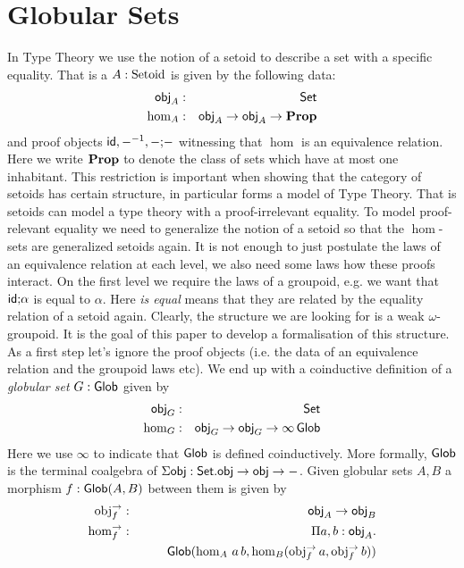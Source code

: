 \section{Globular Sets}
\label{sec:glob}


In Type Theory we use the notion of a setoid to describe a set with a
specific equality. That is a $A : \mathrm{Setoid}$ is given by the
following data:
\begin{eqnarray*}
  \mathsf{obj}_A & : & \mathsf{Set} \\
  \hom_A & : & \mathsf{obj}_A \rightarrow \mathsf{obj}_A \rightarrow \mathbf{Prop}
\end{eqnarray*}
and proof objects $\mathsf{id}, {-}^{-1}, - \text{;} -$ witnessing that $\hom$ is an
equivalence relation. Here we write $\mathbf{Prop}$ to denote the class of sets
which have at most one inhabitant. This restriction is important when
showing that the category of setoids has certain structure, in
particular forms a model of Type Theory. That is setoids can model a
type theory with a proof-irrelevant equality. To model proof-relevant
equality we need to generalize the notion of a setoid so that the
$\hom$-sets are generalized setoids again. It is not enough to just
postulate the laws of an equivalence relation at each level, we also
need some laws how these proofs interact. On the first level we
require the laws of a groupoid, e.g. we want that $\mathsf{id} \text{;} \alpha$ is
equal to $\alpha$. Here \emph{is equal} means that they are related by the
equality relation of a setoid again. Clearly, the structure we are
looking for is a weak $\omega$-groupoid. It is the goal of this paper
to develop a formalisation of this structure. As a first step let's
ignore the proof objects (i.e. the data of an equivalence relation and
the groupoid laws etc).
We end up with a coinductive definition of a \emph{globular set} $G :
\mathsf{Glob}$ given by
\begin{eqnarray*}
  \mathsf{obj}_G & : & \mathsf{Set} \\
  \hom_G & : & \mathsf{obj}_G \rightarrow \mathsf{obj}_G \rightarrow \infty\,\mathsf{Glob}
\end{eqnarray*}
Here we use $\infty$ to indicate that $\mathsf{Glob}$ is defined
coinductively. More formally, $\mathsf{Glob}$ is the terminal coalgebra of
$\Sigma \mathsf{obj} : \mathsf{Set}. \mathsf{obj} \rightarrow \mathsf{obj} \rightarrow -$. Given globular sets
$A,B$ a morphism $f : \mathsf{Glob}(A , B)$ between them is given by 
\begin{eqnarray*}
  \mathrm{obj}^{\rightarrow}_f & : & \mathsf{obj}_A \rightarrow \mathsf{obj}_B \\
  \mathrm{hom}^{\rightarrow}_f & : & \Pi a,b:\mathsf{obj}_A. \\
  && \qquad\mathsf{Glob}(\hom_A\,a\,b,\hom_B(\mathrm{obj}^{\rightarrow}_f\,a,\mathrm{obj}^{\rightarrow}_f\,b))
\end{eqnarray*}
